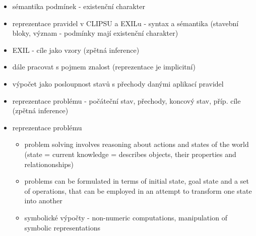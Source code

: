 \begin{framed}
  \begin{itemize}
    \item sémantika podmínek - existenční charakter
    \item reprezentace pravidel v CLIPSU a EXILu - syntax a sémantika
      (stavební bloky, význam - podmínky mají existenční charakter)
    \item EXIL - cíle jako vzory (zpětná inference)
    \item dále pracovat s pojmem znalost (reprezentace je implicitní)
    \item výpočet jako posloupnost stavů s přechody danými aplikací pravidel
    \item reprezentace problému - počáteční stav, přechody, koncový stav,
      příp. cíle (zpětná inference)
    \item reprezentace problému
      \begin{itemize}
        \item problem solving involves reasoning about actions and states of the
          world (state = current knowledge = describes objects, their properties and
          relationonships)
        \item problems can be formulated in terms of initial state, goal state
          and a set of operations, that can be employed in an attempt to
          transform one state into another
        \item symbolické výpočty - non-numeric computations, manipulation of
          symbolic representations
      \end{itemize}
  \end{itemize}
\end{framed}
